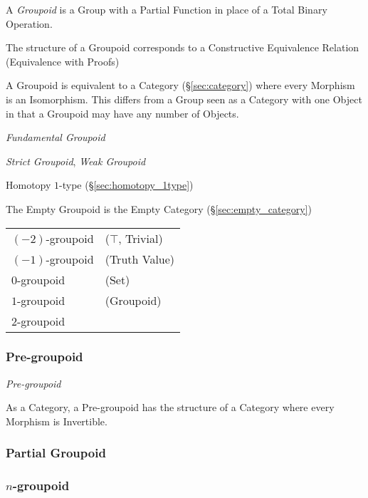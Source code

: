 A \emph{Groupoid} is a Group with a Partial Function in place of a
Total Binary Operation.

The structure of a Groupoid corresponds to a Constructive Equivalence
Relation (Equivalence with Proofs)

A Groupoid is equivalent to a Category (\S\ref{sec:category}) where
every Morphism is an Isomorphism. This differs from a Group seen as a
Category with one Object in that a Groupoid may have any number of
Objects.

\emph{Fundamental Groupoid}

\emph{Strict Groupoid}, \emph{Weak Groupoid}

Homotopy $1$-type (\S\ref{sec:homotopy_1type})

The Empty Groupoid is the Empty Category (\S\ref{sec:empty_category})

\begin{tabular}{l l}
  $(-2)$-groupoid & ($\top$, Trivial) \\

  $(-1)$-groupoid & (Truth Value) \\

  $0$-groupoid    & (Set) \\

  $1$-groupoid    & (Groupoid) \\

  $2$-groupoid    & \\
\end{tabular}



\subsubsection{Pre-groupoid}\label{sec:pre_groupoid}

\emph{Pre-groupoid}

As a Category, a Pre-groupoid has the structure of a Category where
every Morphism is Invertible.



\subsubsection{Partial Groupoid}\label{sec:partial_groupoid}

\subsubsection{$n$-groupoid}\label{sec:n_groupoid}

